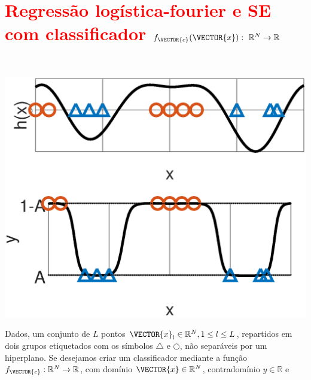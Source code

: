 \newpage


\section{\textcolor{red}{Regressão logística-fourier e SE com classificador $f_{\VECTOR{c}}(\VECTOR{x}):~\mathbb{R}^{N} \rightarrow \mathbb{R}$}}
\label{sec:theo:reglogrnr1fourier:1}


\begin{theorem}\label{theo:reglogrnr1fourier:1}
~\\
\noindent
\begin{minipage}{0.45\textwidth}
\centering
\includegraphics[width=0.95\linewidth]{chapters/classificacao/mfiles/reglogrnr1fourier/reglogrnr1fourier.eps} 
\end{minipage}
\begin{minipage}{0.55\textwidth}
Dados, um conjunto de $L$ pontos $\VECTOR{x}_l \in \mathbb{R}^{N} , 1 \leq l \leq L$,
repartidos em dois grupos etiquetados com os símbolos $\bigtriangleup$ e $\bigcirc$, 
não separáveis por um hiperplano.
Se desejamos criar um classificador mediante 
a função  $f_{\VECTOR{c}}:\mathbb{R}^{N} \rightarrow \mathbb{R}$,
com domínio $\VECTOR{x} \in \mathbb{R}^{N}$, contradomínio $y \in \mathbb{R}$ e 

\end{minipage}
\end{theorem}
